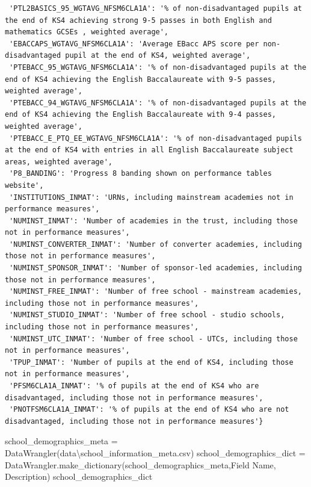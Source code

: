 \documentclass[
  letterpaper,
  DIV=11,
  numbers=noendperiod]{scrartcl}
\newenvironment{Shaded}{\begin{snugshade}}{\end{snugshade}}
\newcommand{\NormalTok}[1]{\textcolor[rgb]{0.00,0.23,0.31}{#1}}
\newcommand{\OperatorTok}[1]{\textcolor[rgb]{0.37,0.37,0.37}{#1}}
\newcommand{\StringTok}[1]{\textcolor[rgb]{0.13,0.47,0.30}{#1}}
\begin{document}
\begin{verbatim}
 'PTL2BASICS_95_WGTAVG_NFSM6CLA1A': '% of non-disadvantaged pupils at the end of KS4 achieving strong 9-5 passes in both English and mathematics GCSEs , weighted average',
 'EBACCAPS_WGTAVG_NFSM6CLA1A': 'Average EBacc APS score per non-disadvantaged pupil at the end of KS4, weighted average',
 'PTEBACC_95_WGTAVG_NFSM6CLA1A': '% of non-disadvantaged pupils at the end of KS4 achieving the English Baccalaureate with 9-5 passes, weighted average',
 'PTEBACC_94_WGTAVG_NFSM6CLA1A': '% of non-disadvantaged pupils at the end of KS4 achieving the English Baccalaureate with 9-4 passes, weighted average',
 'PTEBACC_E_PTQ_EE_WGTAVG_NFSM6CLA1A': '% of non-disadvantaged pupils at the end of KS4 with entries in all English Baccalaureate subject areas, weighted average',
 'P8_BANDING': 'Progress 8 banding shown on performance tables website',
 'INSTITUTIONS_INMAT': 'URNs, including mainstream academies not in performance measures',
 'NUMINST_INMAT': 'Number of academies in the trust, including those not in performance measures',
 'NUMINST_CONVERTER_INMAT': 'Number of converter academies, including those not in performance measures',
 'NUMINST_SPONSOR_INMAT': 'Number of sponsor-led academies, including those not in performance measures',
 'NUMINST_FREE_INMAT': 'Number of free school - mainstream academies, including those not in performance measures',
 'NUMINST_STUDIO_INMAT': 'Number of free school - studio schools, including those not in performance measures',
 'NUMINST_UTC_INMAT': 'Number of free school - UTCs, including those not in performance measures',
 'TPUP_INMAT': 'Number of pupils at the end of KS4, including those not in performance measures',
 'PFSM6CLA1A_INMAT': '% of pupils at the end of KS4 who are disadvantaged, including those not in performance measures',
 'PNOTFSM6CLA1A_INMAT': '% of pupils at the end of KS4 who are not disadvantaged, including those not in performance measures'}
\end{verbatim}

\begin{Shaded}
\begin{Highlighting}[]
\NormalTok{school\_demographics\_meta }\OperatorTok{=}\NormalTok{ DataWrangler(}\StringTok{\textquotesingle{}data\textbackslash{}school\_information\_meta.csv\textquotesingle{}}\NormalTok{)}
\NormalTok{school\_demographics\_dict }\OperatorTok{=}\NormalTok{  DataWrangler.make\_dictionary(school\_demographics\_meta,}\StringTok{\textquotesingle{}Field Name\textquotesingle{}}\NormalTok{, }\StringTok{\textquotesingle{}Description\textquotesingle{}}\NormalTok{)}
\NormalTok{school\_demographics\_dict}
\end{Highlighting}
\end{Shaded}
\end{document}
